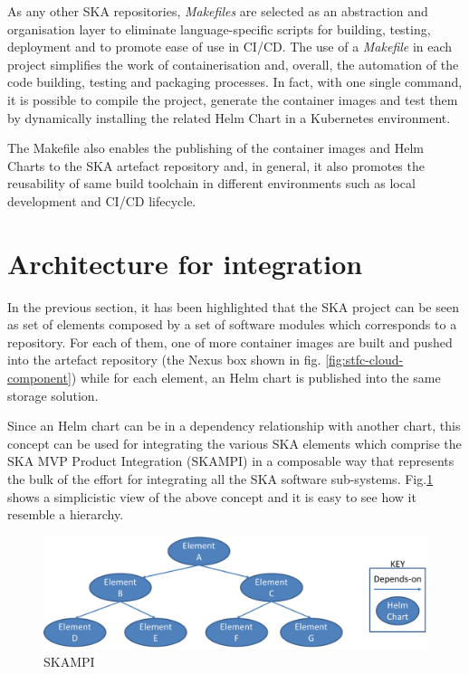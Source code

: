 \documentclass[a4paper,
               keeplastbox,   %
               ]{jacow}
\begin{document}
As any other SKA repositories, \textit{Makefiles} are selected as an abstraction and organisation layer to eliminate language-specific scripts for building, testing, deployment and to promote ease of use in CI/CD. The use of a \textit{Makefile} in each project simplifies the work of containerisation and, overall, the automation of the code building, testing and packaging processes. In fact, with one single command, it is possible to compile the project, generate the container images and test them by dynamically installing the related Helm Chart in a Kubernetes environment.

The Makefile also enables the publishing of the container images and Helm Charts to the SKA artefact repository and, in general, it also promotes the reusability of same build toolchain in different environments such as local development and CI/CD lifecycle.


\section{Architecture for integration}

In the previous section, it has been highlighted that the SKA project can be seen as set of elements composed by a set of software modules which corresponds to a repository. For each of them, one of more container images are built and pushed into the artefact repository (the Nexus\cite{nexus} box shown in fig. \ref{fig:stfc-cloud-component}) while for each element, an Helm chart is published into the same storage solution. 

Since an Helm chart can be in a dependency relationship with another chart, this concept can be used for integrating the various SKA elements which comprise the SKA MVP Product Integration (SKAMPI\cite{SKAMPI}) in a composable way that represents the bulk of the effort for integrating all the SKA software sub-systems. Fig.\ref{fig:skampi} shows a simplicistic view of the above concept and it is easy to see how it resemble a hierarchy.

\begin{figure}[!htb]
	\centering
	\includegraphics*[width=0.8\columnwidth]{simple_skampi}
	\caption{SKAMPI}
	\label{fig:skampi}
\end{figure}
\end{document}
